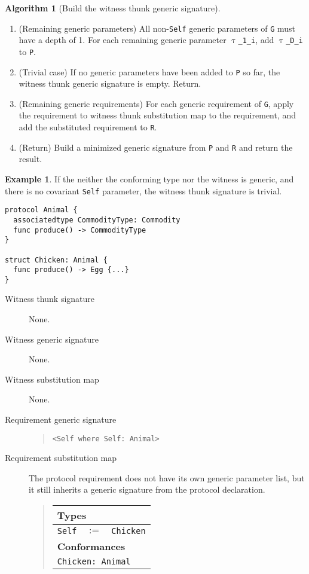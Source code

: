 \documentclass[a4paper,headsepline,bibliography=totoc,toc=flat,fleqn,twoside=semi]{scrbook}
\theoremstyle{definition}
\theoremstyle{definition}
\newtheorem{example}{Example}[chapter]
\theoremstyle{definition}
\newtheorem{algorithm}{Algorithm}[chapter]
\newcommand{\ttgp}[2]{\texttt{$\uptau$\_#1\_#2}}
\newcommand{\SubMapC}[2]{\begin{tabular}{|lll|}
\hline
\multicolumn{3}{|l|}{\textbf{Types}}\\
\hline
#1\\
\hline
\hline
\multicolumn{3}{|l|}{\textbf{Conformances}}\\
\hline
#2\\
\hline
\end{tabular}}
\newcommand{\SubType}[2]{\texttt{#1}&$:=$&\texttt{#2}}
\newcommand{\SubConf}[1]{\multicolumn{3}{|l|}{\texttt{#1}}}
\begin{document}
\begin{algorithm}[Build the witness thunk generic signature]
\begin{enumerate}
\begin{enumerate}
\item (Context generic requirements) Add all generic requirements of $\texttt{G}'$ to \texttt{R}.
\end{enumerate}
\item (Remaining generic parameters) All non-\texttt{Self} generic parameters of \texttt{G} must have a depth of 1. For each remaining generic parameter \ttgp{1}{i}, add \ttgp{D}{i} to \texttt{P}.
\item (Trivial case) If no generic parameters have been added to \texttt{P} so far, the witness thunk generic signature is empty. Return.
\item (Remaining generic requirements) For each generic requirement of \texttt{G}, apply the requirement to witness thunk substitution map to the requirement, and add the substituted requirement to \texttt{R}.
\item (Return) Build a minimized generic signature from \texttt{P} and \texttt{R} and return the result.

\end{enumerate}
\end{algorithm}

\vfill
\eject

\begin{example} If the neither the conforming type nor the witness is generic, and there is no covariant \texttt{Self} parameter, the witness thunk signature is trivial.
\begin{Verbatim}
protocol Animal {
  associatedtype CommodityType: Commodity
  func produce() -> CommodityType
}

struct Chicken: Animal {
  func produce() -> Egg {...}
}
\end{Verbatim}
\begin{description}
\item[Witness thunk signature] None.
\item[Witness generic signature] None.
\item[Witness substitution map] None.
\item[Requirement generic signature]  \vphantom{a}
\begin{quote}
\texttt{<Self where Self:\ Animal>}
\end{quote}
\item[Requirement substitution map] The protocol requirement does not have its own generic parameter list, but it still inherits a generic signature from the protocol declaration.
\begin{quote}
\SubMapC{
\SubType{Self}{Chicken}
}{
\SubConf{Chicken:\ Animal}
}
\end{quote}
\end{description}
\end{example}
\end{document}
